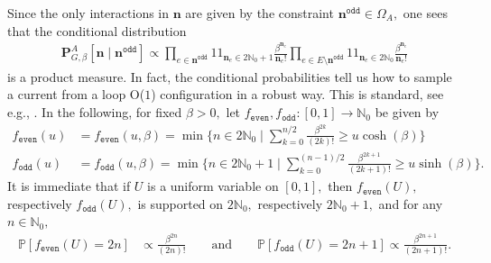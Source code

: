 \documentclass[article,11pt,reqno]{amsart}
\newcommand{\id}{1\! \!1}
\begin{document}
Since the only interactions in $\mathbf{n}$ are given by the constraint $\mathbf{n}^{\mathtt{odd}}\in \Omega_A,$ one sees that the conditional distribution 
\begin{align} \label{Resampling density}\mathbf{P}^A_{G,\beta}[\mathbf{n}\mid \mathbf{n}^{\mathtt{odd}}]\propto \prod_{e\in \mathbf{n}^{\mathtt{odd}}} \id_{\mathbf{n}_e\in 2\mathbb{N}_0+1}\frac{\beta^{\mathbf{n}_e}}{\mathbf{n}_e!}\prod_{e\in E\setminus \mathbf{n}^{\mathtt{odd}}} \id_{\mathbf{n}_e\in 2\mathbb{N}_0} \frac{\beta^{\mathbf{n}_e}}{\mathbf{n}_e!}
\end{align}
is a product measure.
In fact, the conditional probabilities tell us how to sample a current from a loop O($1$) configuration in a robust way. This is standard, see e.g., \cite[Equation 4.5]{Hutchcroft_continuity_2023}. In the following, for fixed $\beta>0,$ let $f_{\mathtt{even}},f_{\mathtt{odd}}:[0,1]\to \mathbb{N}_0$ be given by 
\begin{align*}
    f_{\mathtt{even}}(u) &=f_{\mathtt{even}}(u,\beta)=\min\{n \in 2\mathbb{N}_0\mid \sum_{k=0}^{n/2} \frac{\beta^{2k}}{(2k)!}\geq u\cosh(\beta) \} \\
    f_{\mathtt{odd}}(u) &=f_{\mathtt{odd}}(u,\beta)=\min\{n \in 2\mathbb{N}_0+1\mid \sum_{k=0}^{(n-1)/2} \frac{\beta^{2k+1}}{(2k+1)!}\geq u\sinh(\beta) \}.
\end{align*}
It is immediate that if $U$ is a uniform variable on $[0,1],$ then $f_{\mathtt{even}}(U),$ respectively $f_\mathtt{odd}(U),$ is supported on $2\mathbb{N}_0,$ respectively $2\mathbb{N}_0+1,$ and for any $n\in \mathbb{N}_0,$ 
\begin{align} \label{Parity weights}
\mathbb{P}[f_{\mathtt{even}}(U)=2n]&\propto \frac{\beta^{2n}}{(2n)!} \qquad \mathrm{and}\qquad
\mathbb{P}[f_{\mathtt{odd}}(U)=2n+1]\propto \frac{\beta^{2n+1}}{(2n+1)!}.
\end{align}
\end{document}
